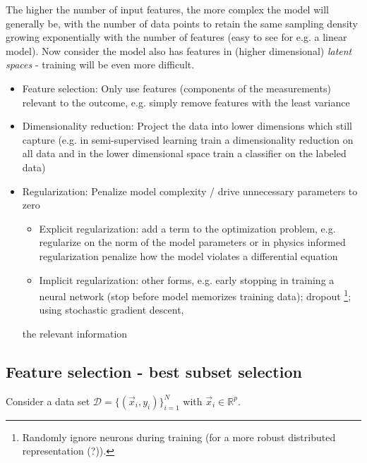 The higher the number of input features, the more complex the model will generally be, with 
the number of data points to retain the same sampling density growing exponentially with the number of features
(easy to see for e.g. a linear model). Now consider the model also has features in (higher dimensional)
\textit{latent spaces} - training will be even more difficult.


\begin{itemize}
    \item \textcolor{blue1}{Feature selection}: Only use features (components of the measurements) relevant to the outcome, e.g. simply remove features with the least variance
    \item \textcolor{blue1}{Dimensionality reduction}: Project the data into lower dimensions which still capture (e.g. in semi-supervised learning train a dimensionality reduction on all data
    and in the lower dimensional space train a classifier on the labeled data)
    \item \textcolor{blue1}{Regularization}: Penalize model complexity / drive unnecessary parameters to zero
    \begin{itemize}
        \item Explicit regularization: add a term to the optimization problem, e.g. regularize on the norm of the model parameters or in physics informed regularization penalize how the model violates a differential equation
        \item Implicit regularization: other forms, e.g. early stopping in training a neural network (stop before model memorizes training data); dropout \footnote{Randomly ignore neurons during training (for a more robust distributed representation (?)).}; using stochastic gradient descent, 
    \end{itemize}
    the relevant information
\end{itemize}

\subsection{Feature selection - best subset selection}
Consider a data set $\mathcal{D} = \{(\vec{x}_i, y_i)\}_{i=1}^N$ with $\vec{x}_i \in \mathbb{R}^p$.


